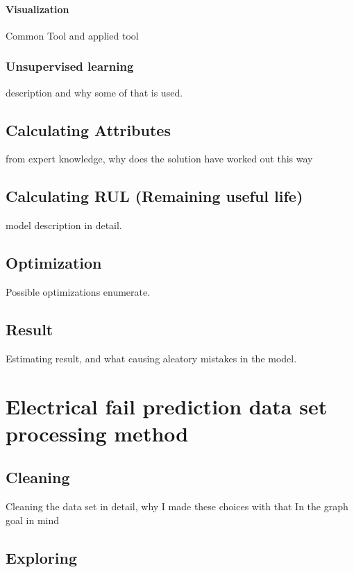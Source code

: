 		\paragraph{Visualization}
		Common Tool and applied tool
	\subsubsection{Unsupervised learning}
	description and why some of that is used.
\subsection{Calculating Attributes}
	from expert knowledge, why does the solution have worked out this way
\subsection{Calculating RUL (Remaining useful life)}
	model description in detail.
\subsection{Optimization}
Possible optimizations enumerate.
\subsection{Result}
Estimating result, and what causing aleatory mistakes in the model. 
\section{Electrical fail prediction data set processing method}
	\subsection{Cleaning}
Cleaning the data set in detail, why I made these choices with that In the graph goal in mind
	\subsection{Exploring}
